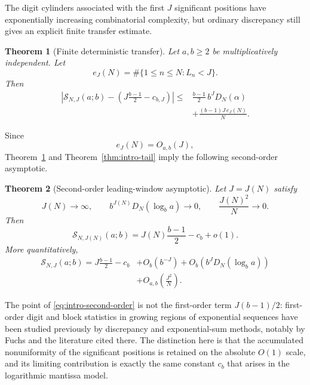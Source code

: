 \documentclass[11pt]{article}
\newtheorem{theorem}{Theorem}[section]
\theoremstyle{definition}
\theoremstyle{remark}
\begin{document}
The digit cylinders associated with the first \(J\) significant
positions have exponentially increasing combinatorial complexity, but
ordinary discrepancy still gives an explicit finite transfer estimate.

\begin{theorem}[Finite deterministic transfer]
\label{thm:intro-deterministic-finite}
Let \(a,b\ge2\) be multiplicatively independent.  Let
\[
    e_J(N)
    =
    \#\{1\le n\le N:L_n<J\}.
\]
Then
\begin{equation}
\boxed{
\begin{aligned}
    \left|
        \mathcal S_{N,J}(a;b)
        -
        \left(
            J\frac{b-1}{2}-c_{b,J}
        \right)
    \right|
    \le{}&
    \frac{b-1}{2}\,b^J D_N(\alpha)
    \\
    &+
    \frac{(b-1)J\,e_J(N)}{N}.
\end{aligned}
}
\label{eq:intro-finite-transfer}
\end{equation}
\end{theorem}

Since
\[
    e_J(N)=O_{a,b}(J),
\]
Theorem~\ref{thm:intro-deterministic-finite} and
Theorem~\ref{thm:intro-tail} imply the following second-order
asymptotic.

\begin{theorem}[Second-order leading-window asymptotic]
\label{thm:intro-second-order}
Let \(J=J(N)\) satisfy
\[
    J(N)\longrightarrow\infty,
    \qquad
    b^{J(N)}D_N(\log_b a)\longrightarrow0,
    \qquad
    \frac{J(N)^2}{N}\longrightarrow0.
\]
Then
\begin{equation}
\boxed{
    \mathcal S_{N,J(N)}(a;b)
    =
    J(N)\frac{b-1}{2}
    -
    c_b
    +
    o(1).
}
\label{eq:intro-second-order}
\end{equation}
More quantitatively,
\begin{equation}
\begin{aligned}
    \mathcal S_{N,J}(a;b)
    =
    J\frac{b-1}{2}
    -
    c_b
    &+
    O_b(b^{-J})
    +
    O_b\!\left(b^J D_N(\log_b a)\right)
    \\
    &+
    O_{a,b}\!\left(\frac{J^2}{N}\right).
\end{aligned}
\label{eq:intro-second-order-quantitative}
\end{equation}
\end{theorem}

The point of
\eqref{eq:intro-second-order} is not the first-order term
\(J(b-1)/2\): first-order digit and block statistics in growing regions
of exponential sequences have been studied previously by discrepancy
and exponential-sum methods, notably by Fuchs
\cite{Fuchs2002} and the literature cited there.
The distinction here is that the accumulated nonuniformity of the
significant positions is retained on the absolute \(O(1)\) scale,
and its limiting contribution is exactly the same constant \(c_b\)
that arises in the logarithmic mantissa model.
\end{document}
